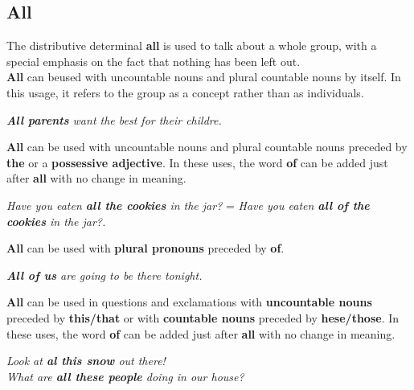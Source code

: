 \documentclass[10pt,a4paper]{article}
\begin{document}
\subsection{All}
The distributive determinal \textbf{all} is used to talk about a whole group, with a special emphasis on the fact that nothing has been left out.\\
\indent \textbf{All} can beused with uncountable nouns and plural countable nouns by itself. In this usage, it refers to the group as a concept rather than as individuals.
\begin{center}
\textit{ \textbf{All parents} want the best for their childre.}
\end{center}
\textbf{All} can be used with uncountable nouns and plural countable nouns preceded by \textbf{the} or a \textbf{possessive adjective}. In these uses, the word \textbf{of} can be added just after \textbf{all} with no change in meaning.
\begin{center}
\textit{ Have you eaten \textbf{all the cookies} in the jar?} = \textit{Have you eaten \textbf{all of the cookies} in the jar?.}
\end{center}
\textbf{All} can be used with \textbf{plural pronouns} preceded by \textbf{of}.
\begin{center}
\textit{ \textbf{All of us} are going to be there tonight.}
\end{center}
\textbf{All} can be used in questions and exclamations with \textbf{uncountable nouns} preceded by \textbf{this/that} or with \textbf{countable nouns} preceded by \textbf{hese/those}.  In these uses, the word \textbf{of} can be added just after \textbf{all} with no change in meaning.
\begin{center}
\textit{ Look at \textbf{al this snow} out there!\\
What are \textbf{all these people} doing in our house?}
\end{center}
\end{document}
